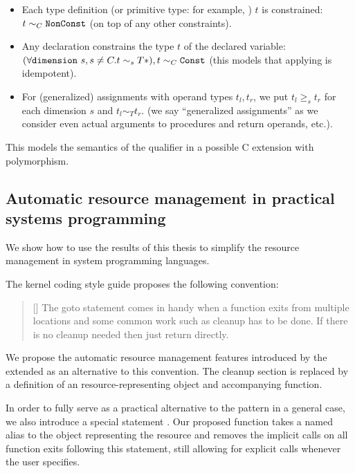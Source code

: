 \begin{itemize}
    \item Each type definition (or primitive type: for example, ) $t$ is constrained: $t \sim_C \mathtt{NonConst}$ (on top of any other constraints).

    \item Any declaration  constrains the type $t$ of the declared variable: $(\forall \mathtt{dimension}\ s, s \neq C. t \sim_s T\ast), t \sim_C \mathtt{Const}$ (this models that applying  is idempotent).

    \item For (generalized) assignments with operand types $t_l, t_r$, we put $t_l \geq_s t_r$ for each dimension $s$ and $t_l \sim_T t_r$. (we say ``generalized assignments'' as we consider even actual arguments to procedures and return operands, etc.).
\end{itemize}

This models the semantics of the  qualifier in a possible C extension with polymorphism.

\subsection{Automatic resource management in practical systems programming}

We show how to use the results of this thesis to simplify the resource management in system programming languages.

The kernel coding style guide proposes the following convention:

\begin{quotation}[]
  The goto statement comes in handy when a function exits from multiple locations and some common work such as cleanup has to be done. If there is no cleanup needed then just return directly.
\end{quotation}

We propose the automatic resource management features introduced by the extended \cmm{} as an alternative to this convention. The cleanup section is replaced by a definition of an resource-representing object and accompanying  function.

In order to fully serve as a practical alternative to the  pattern in a general case, we also introduce a special statement . Our proposed  function takes a named alias to the object representing the resource and removes the implicit calls on all function exits following this statement, still allowing for explicit calls whenever the user specifies.

